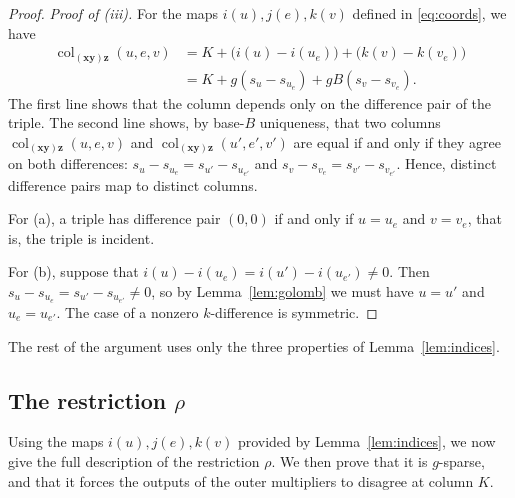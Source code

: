 \documentclass[11pt]{article}
\theoremstyle{definition}
\theoremstyle{remark}
\newcommand{\col}{\operatorname{col}}
\newcommand{\vv}[1]{\mathbf{#1}}
\begin{document}
\begin{proof}
\emph{Proof of (iii).} For the maps $i(u), j(e), k(v)$ defined in \eqref{eq:coords}, we have
\begin{align*}
\col_{(\vv{x}\vv{y})\vv{z}}(u,e,v)&=K+\bigl(i(u)-i(u_e)\bigr)+\bigl(k(v)-k(v_e)\bigr)\\
&=K+g(s_u-s_{u_e})+gB(s_v-s_{v_e}).
\end{align*}
The first line shows that the column depends only on the difference pair of the triple.
The second line shows, by base-$B$ uniqueness, that two columns $\col_{(\vv{x}\vv{y})\vv{z}}(u,e,v)$ and $\col_{(\vv{x}\vv{y})\vv{z}}(u',e',v')$ are equal if and only
if they agree on both differences: $s_u - s_{u_e} = s_{u'} - s_{u_{e'}}$ and $s_v-s_{v_e} = s_{v'}-s_{v_{e'}}$. Hence, distinct difference pairs map to distinct columns.

For (a), a triple has difference pair $(0,0)$ if and only if
$u=u_e$ and $v=v_e$, that is, the triple is incident.

For (b), suppose that $i(u)-i(u_e)=i(u')-i(u_{e'})\ne0$. Then
$s_u-s_{u_e}=s_{u'}-s_{u_{e'}}\ne0$, so by Lemma~\ref{lem:golomb} we must have $u=u'$ and $u_e =
u_{e'}$. The case of a nonzero $k$-difference is symmetric.
\end{proof}

The rest of the argument uses only the three properties of Lemma~\ref{lem:indices}.

\subsection{The restriction \texorpdfstring{$\rho$}{rho}}
\label{sec:restricted}

Using the maps $i(u), j(e), k(v)$ provided by Lemma~\ref{lem:indices}, we now give the full description of the restriction $\rho$. We then prove
that it is $g$-sparse, and that it forces the outputs of the outer multipliers to disagree at column $K$.
\end{document}
